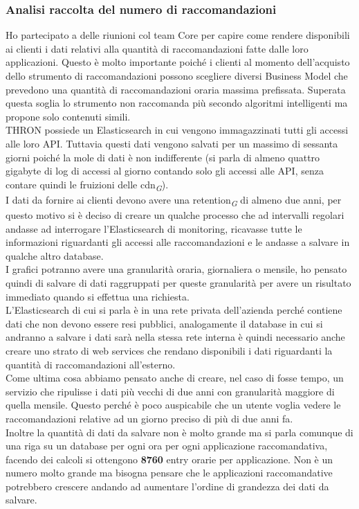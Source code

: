 \documentclass[a4paper, 12pt, twoside, openright]{book}
\newcommand{\gloss}[1]{#1\textsubscript{\textit{\tiny{G}}}}
\begin{document}
\subsubsection{Analisi raccolta del numero di raccomandazioni}
Ho partecipato a delle riunioni col team Core per capire come rendere disponibili ai clienti i dati relativi alla quantità di raccomandazioni fatte dalle loro applicazioni. Questo è molto importante poiché i clienti al momento dell'acquisto dello strumento di raccomandazioni possono scegliere diversi Business Model che prevedono una quantità di raccomandazioni oraria massima prefissata. Superata questa soglia lo strumento non raccomanda più secondo algoritmi intelligenti ma propone solo contenuti simili.\\
THRON possiede un Elasticsearch in cui vengono immagazzinati tutti gli accessi alle loro API. Tuttavia questi dati vengono salvati per un massimo di sessanta giorni poiché la mole di dati è non indifferente (si parla di almeno quattro gigabyte di log di accessi al giorno contando solo gli accessi alle API, senza contare quindi le fruizioni delle \gloss{cdn}).\\
I dati da fornire ai clienti devono avere una \gloss{retention} di almeno due anni, per questo motivo si è deciso di creare un qualche processo che ad intervalli regolari andasse ad interrogare l'Elasticsearch di monitoring, ricavasse tutte le informazioni riguardanti gli accessi alle raccomandazioni e le andasse a salvare in qualche altro database.\\
I grafici potranno avere una granularità oraria, giornaliera o mensile, ho pensato quindi di salvare di dati raggruppati per queste granularità per avere un risultato immediato quando si effettua una richiesta.\\
L'Elasticsearch di cui si parla è in una rete privata dell'azienda perché contiene dati che non devono essere resi pubblici, analogamente il database in cui si andranno a salvare i dati sarà nella stessa rete interna è quindi necessario anche creare uno strato di web services che rendano disponibili i dati riguardanti la quantità di raccomandazioni all'esterno.\\
Come ultima cosa abbiamo pensato anche di creare, nel caso di fosse tempo, un servizio che ripulisse i dati più vecchi di due anni con granularità maggiore di quella mensile. Questo perché è poco auspicabile che un utente voglia vedere le raccomandazioni relative ad un giorno preciso di più di due anni fa.\\
Inoltre la quantità di dati da salvare non è molto grande ma si parla comunque di una riga su un database per ogni ora per ogni applicazione raccomandativa, facendo dei calcoli si ottengono \textbf{8760} entry orarie per applicazione. Non è un numero molto grande ma bisogna pensare che le applicazioni raccomandative potrebbero crescere andando ad aumentare l'ordine di grandezza dei dati da salvare.\\
\end{document}
